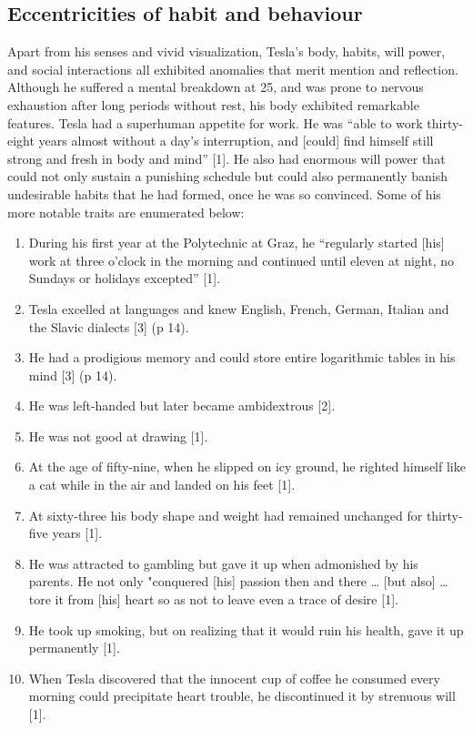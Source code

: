 \documentclass[
  11pt,
  a4paper,
]{article}
\providecommand{\tightlist}{%
  \setlength{\itemsep}{0pt}\setlength{\parskip}{0pt}}
\begin{document}
\hypertarget{eccentricities-of-habit-and-behaviour}{%
\subsection{Eccentricities of habit and
behaviour}\label{eccentricities-of-habit-and-behaviour}}

Apart from his senses and vivid visualization, Tesla's body, habits,
will power, and social interactions all exhibited anomalies that merit
mention and reflection. Although he suffered a mental breakdown at 25,
and was prone to nervous exhaustion after long periods without rest, his
body exhibited remarkable features. Tesla had a superhuman appetite for
work. He was ``able to work thirty-eight years almost without a day's
interruption, and {[}could{]} find himself still strong and fresh in
body and mind'' {[}1{]}. He also had enormous will power that could not
only sustain a punishing schedule but could also permanently banish
undesirable habits that he had formed, once he was so convinced. Some of
his more notable traits are enumerated below:

\begin{enumerate}
\tightlist
\item
  During his first year at the Polytechnic at Graz, he ``regularly
  started {[}his{]} work at three o'clock in the morning and continued
  until eleven at night, no Sundays or holidays excepted'' {[}1{]}.
\item
  Tesla excelled at languages and knew English, French, German, Italian
  and the Slavic dialects {[}3{]} (p 14).
\item
  He had a prodigious memory and could store entire logarithmic tables
  in his mind {[}3{]} (p 14).
\item
  He was left-handed but later became ambidextrous {[}2{]}.
\item
  He was not good at drawing {[}1{]}.
\item
  At the age of fifty-nine, when he slipped on icy ground, he righted
  himself like a cat while in the air and landed on his feet {[}1{]}.
\item
  At sixty-three his body shape and weight had remained unchanged for
  thirty-five years {[}1{]}.
\item
  He was attracted to gambling but gave it up when admonished by his
  parents. He not only "conquered {[}his{]} passion then and there
  \ldots{} {[}but also{]} \ldots{} tore it from {[}his{]} heart so as
  not to leave even a trace of desire {[}1{]}.
\item
  He took up smoking, but on realizing that it would ruin his health,
  gave it up permanently {[}1{]}.
\item
  When Tesla discovered that the innocent cup of coffee he consumed
  every morning could precipitate heart trouble, he discontinued it by
  strenuous will {[}1{]}.
\end{enumerate}
\end{document}
